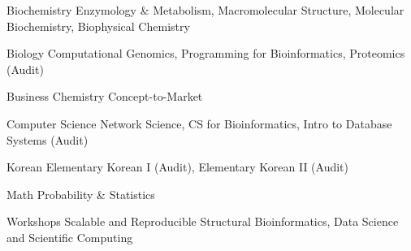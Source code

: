 \vspace{2mm}

\begin{cvskills}

  \cvskill
    {Biochemistry} %
    {Enzymology \& Metabolism, Macromolecular Structure, Molecular Biochemistry, Biophysical Chemistry} %
     
  \cvskill
    {Biology} %
    {Computational Genomics, Programming for Bioinformatics, Proteomics (Audit)} %
    
  \cvskill
    {Business} %
    {Chemistry Concept-to-Market} %
    
  \cvskill
    {Computer Science} %
    {Network Science, CS for Bioinformatics, Intro to Database Systems (Audit)} %
    
  \cvskill
    {Korean} %
    {Elementary Korean I (Audit), Elementary Korean II (Audit)} %
    
  \cvskill
    {Math} %
    {Probability \& Statistics} %

  \cvskill
    {Workshops} %
    {Scalable and Reproducible Structural Bioinformatics, Data Science and Scientific Computing} %
    
\vspace{-8.0mm}
\end{cvskills}